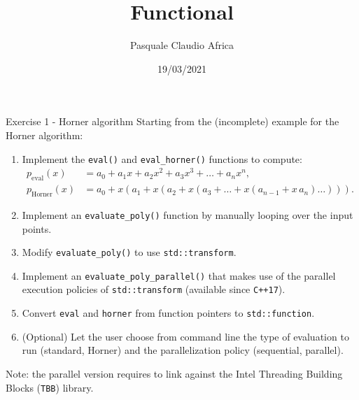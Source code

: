\documentclass[10pt]{beamer}
\begin{document}
    \title{Functional}
    \author{Pasquale Claudio Africa}
    \date{19/03/2021}
    
\begin{frame}
    \maketitle
\end{frame}

\begin{frame}{Exercise 1 - Horner algorithm}
Starting from the (incomplete) example for the Horner algorithm:
\begin{enumerate}
\item Implement the \texttt{eval()} and \texttt{eval\_horner()} functions to compute:
\begin{align*}
p_\text{eval}(x) &= a_0 + a_1x + a_2x^2 + a_3x^3 + \ldots + a_nx^n, \\
p_\text{Horner}(x) &= a_0 + x \left(a_1 + x \left(a_2 + x \left(a_3 + \ldots + x\left(a_{n-1} + x \, a_n\right) \ldots \right) \right) \right).
\end{align*}
\item Implement an \texttt{evaluate\_poly()} function by manually looping over the input points.
\item Modify \texttt{evaluate\_poly()} to use \texttt{std::transform}.
\item Implement an \texttt{evaluate\_poly\_parallel()} that makes use of the parallel execution policies of \texttt{std::transform} (available since \texttt{C++17}).
\item Convert \texttt{eval} and \texttt{horner} from function pointers to \texttt{std::function}.
\item (Optional) Let the user choose from command line the type of evaluation to run (standard, Horner) and the parallelization policy (sequential, parallel).
\end{enumerate}

Note: the parallel version requires to link against the Intel Threading Building Blocks (\texttt{TBB}) library.
\end{frame}
\end{document}

